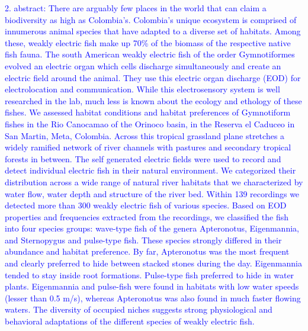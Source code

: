 \documentclass[12pt,a4paper,pdftex]{article}
\begin{document}
\textcolor{blue}{2. abstract: There are arguably few places in the world that can claim a biodiversity as high as Colombia’s. Colombia’s unique ecosystem is comprised of innumerous animal species that have adapted to a diverse set of habitats. Among these, weakly electric fish make up 70\% of the biomass of the respective native fish fauna. The south American weakly electric fish of the order Gymnotiformes evolved an electric organ which cells discharge simultaneously and create an electric field around the animal. They use this electric organ discharge (EOD) for electrolocation and communication. While this electrosensory system is well researched in the lab, much less is known about the ecology and ethology of these fishes. We assessed habitat conditions and habitat preferences of Gymnotiform fishes in the Rio Canocamao of the Orinoco basin, in the Reserva el Caduceo in San Martin, Meta, Colombia. Across this tropical grassland plane stretches a widely ramified network of river channels with pastures and secondary tropical forests in between. The self generated electric fields were used to record and detect individual electric fish in their natural environment. We categorized their distribution across a wide range of natural river habitats that we characterized by water flow, water depth and structure of the river bed. Within 139 recordings we detected more than 300 weakly electric fish of various species. Based on EOD properties and frequencies extracted from the recordings, we classified the fish into four species groups: wave-type fish of the genera Apteronotus, Eigenmannia, and Sternopygus and pulse-type fish. These species strongly differed in their abundance and habitat preference. By far, Apteronotus was the most frequent and clearly preferred to hide between stacked stones during the day. Eigenmannia tended to stay inside root formations. Pulse-type fish preferred to hide in water plants. Eigenmannia and pulse-fish were found in habitats with low water speeds (lesser than   0.5 m/s), whereas Apteronotus was also found in much faster flowing waters. The diversity of occupied niches suggests strong physiological and behavioral adaptations of the different species of weakly electric fish.}
\end{document}
